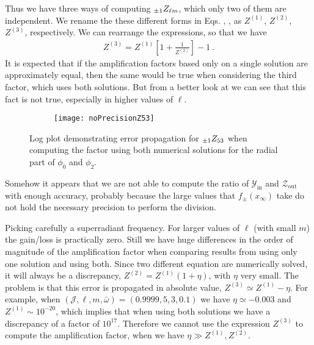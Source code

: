 Thus we have three ways of computing $\uu[\pm 1]{Z}{\ell m}$, which only two of them are independent.
We rename the these different forms in Eqs. , ,  as $Z^{(1)}$, $Z^{(2)}$, $Z^{(3)}$, respectively.
We can rearrange the expressions, so that we have
\begin{align}
	Z^{(3)} = Z^{(1)} \left[ 1 + \frac{1}{Z^{(2)}} \right] - 1 ~.
\end{align}
It is expected that if the amplification factors based only on a single solution are approximately equal, then the same would be true when considering the third factor, which uses both solutions.
But from a better look at  we can see that this fact is not true, especially in higher values of $\ell$.
\begin{figure}[h]
	\centering
	\vspace{0.2cm}
	\begin{subfigure}[c]{0.6\textwidth}
        \texttt{[image: noPrecisionZ53]}
	\end{subfigure}
	\caption{Log plot demonstrating error propagation for $\uu[\pm 1]{Z}{53}$ when computing the factor using both numerical solutions for the radial part of $\phi_0$ and $\phi_2$.}
	\label{fig4:plotZ53}
\end{figure}
Somehow it appears that we are not able to compute the ratio of $\mathscr{Y}_\mathrm{in}$ and $\mathscr{Z}_\mathrm{out}$ with enough accuracy, probably because the large values that $f_{\pm}(x_\infty)$ take do not hold the necessary precision to perform the division.

Picking carefully a superradiant frequency. For larger values of $\ell$ (with small $m$) the gain/loss is practically zero.
Still we have huge differences in the order of magnitude of the amplification factor when comparing results from using only one solution and using both.
Since two different equation are numerically solved, it will always be a discrepancy, $Z^{(2)} = Z^{(1)} (1+\eta)$, with $\eta$ very small.
The problem is that this error is propagated in absolute value, $Z^{(3)} \simeq Z^{(1)} - \eta$.
For example, when $(\mathscr{J}, \ell, m, \bar{\omega})=(0.9999,5,3,0.1)$ we have $\eta \simeq -0.003$ and $Z^{(1)}\sim 10^{-20}$, which implies that when using both solutions we have a discrepancy of a factor of $10^{17}$.
Therefore we cannot use the expression $Z^{(3)}$ to compute the amplification factor, when we have $\eta \gg Z^{(1)} , Z^{(2)}$.

